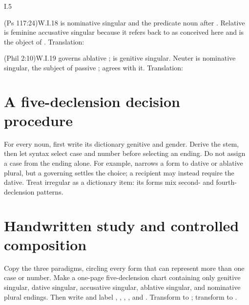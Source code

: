 \begin{courseunit}{I.5}
\begin{workedexample}{ (Ps 117:24)}{W.I.18}
 is nominative singular and the predicate noun after .
Relative  is feminine accusative singular because it refers back
to  as conceived here and is the object of .
Translation: 
\end{workedexample}

\begin{workedexample}{ (Phil 2:10)}{W.I.19}
 governs ablative ;  is genitive singular.
Neuter  is nominative singular, the subject of passive
;  agrees with it. Translation: 
\end{workedexample}

\section{A five-declension decision procedure}

For every noun, first write its dictionary genitive and gender. Derive the
stem, then let syntax select case and number before selecting an ending. Do
not assign a case from the ending alone. For example,  narrows a
form to dative or ablative plural, but a governing  settles the
choice; a recipient may instead require the dative. Treat irregular
 as a dictionary item: its forms mix second- and
fourth-declension patterns.

\section{Handwritten study and controlled composition}

Copy the three paradigms, circling every form that can represent more than one
case or number. Make a one-page five-declension chart containing only genitive
singular, dative singular, accusative singular, ablative singular, and
nominative plural endings. Then write and label ,
, , , and .
Transform  to ; transform
 to .



\end{courseunit}

